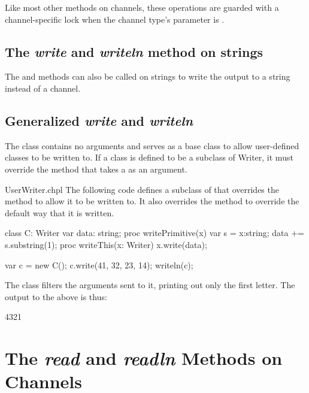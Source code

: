 Like most other methods on channels,
these operations are guarded with a channel-specific lock
when the channel type's  parameter is .


\subsection{The {\em write} and {\em writeln} method on strings}
\label{stringwrite}

The  and  methods can also be called on
strings to write the output to a string instead of a channel.

\subsection{Generalized {\em write} and {\em writeln}}
\label{writer}

The  class contains no arguments and serves as a base
class to allow user-defined classes to be written to.  If a class is
defined to be a subclass of Writer, it must override
the  method that takes a  as an argument.

\begin{chapelexample}{UserWriter.chpl}
The following code defines a subclass of  that overrides
the  method to allow it to be written to.  It also
overrides the  method to override the default way that
it is written.
\begin{chapel}
class C: Writer {
  var data: string;
  proc writePrimitive(x) {
    var s = x:string;
    data += s.substring(1);
  }
  proc writeThis(x: Writer) {
    x.write(data);
  }
}

var c = new C();
c.write(41, 32, 23, 14);
writeln(c);
\end{chapel}
The  class filters the arguments sent to it, printing out only
the first letter.  The output to the above is thus:
\begin{chapelprintoutput}
4321
\end{chapelprintoutput}
\end{chapelexample}


\section{The {\em read} and {\em readln} Methods on Channels}
\label{IO_channel_read}

